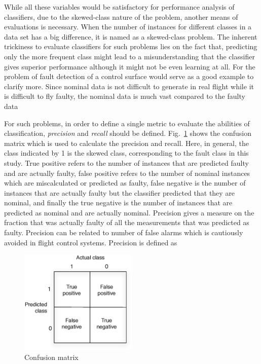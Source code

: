 While all these variables would be satisfactory for performance analysis of classifiers, due to the skewed-class nature of the problem, another means of evaluations is necessary.
When the number of instances for different classes in a data set has a big difference, it is named as a skewed-class problem. 
The inherent trickiness to evaluate classifiers for such problems lies on the fact that, predicting only the more frequent class might lead to a misunderstanding that the classifier gives superior performance although it might not be even learning at all. 
For the problem of fault detection of a control surface would serve as a good example to clarify more. 
Since nominal data is not difficult to generate in real flight while it is difficult to fly faulty, the nominal data is much vast compared to the faulty data 

For such problems, in order to define a single metric to evaluate the abilities of classification, \emph{precision} and \emph{recall} should be defined.   
Fig.~\ref{fig:confusionMatrix} shows the confusion matrix which is used to calculate the precision and recall. 
Here, in general, the class indicated by 1 is the skewed class, corresponding to the fault class in this study. 
True positive refers to the number of instances that are predicted faulty and are actually faulty, false positive refers to the number of nominal instances which are miscalculated or predicted as faulty, false negative is the number of instances that are actually faulty but the classifier predicted that they are nominal, and finally the true negative is the number of instances that are predicted as nominal and are actually nominal.
Precision gives a measure on the fraction that was actually faulty of all the measurements that was predicted as faulty. 
Precision can be related to number of false alarms which is cautiously avoided in flight control systems. Precision is defined as 

\begin{figure}
\begin{center}
\includegraphics[width=0.5\textwidth]{figures/confusionMatrix}    %
\caption{Confusion matrix} 
\label{fig:confusionMatrix}
\end{center}
\end{figure}


